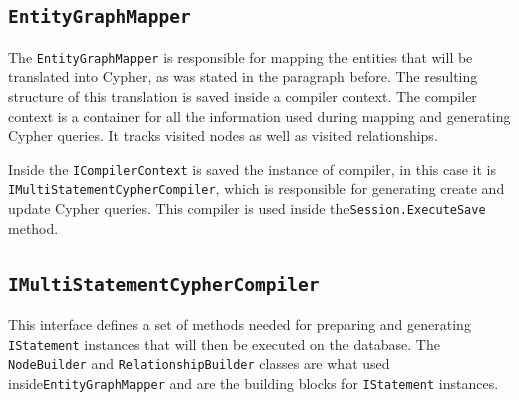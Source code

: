 \subsection{\texttt{EntityGraphMapper}}

The \texttt{EntityGraphMapper} is responsible for mapping the entities that will be translated into Cypher, as was stated in the paragraph before.
The resulting structure of this translation is saved inside a compiler context. The compiler context is a container for all the information
used during mapping and generating Cypher queries. It tracks visited nodes as well as visited relationships.

Inside the \texttt{ICompilerContext} is saved the instance of compiler, in this case it is \texttt{IMultiStatementCypherCompiler},
which is responsible for generating create and update Cypher queries. This compiler is used inside the\linebreak\texttt{Session.ExecuteSave} method.

\subsection{\texttt{IMultiStatementCypherCompiler}}


This interface defines a set of methods needed for preparing and generating \texttt{IStatement} instances that will then be executed on the database.
The \texttt{NodeBuilder} and \texttt{RelationshipBuilder} classes are what used inside\linebreak\texttt{EntityGraphMapper} and are the building blocks for
\texttt{IStatement} instances.

